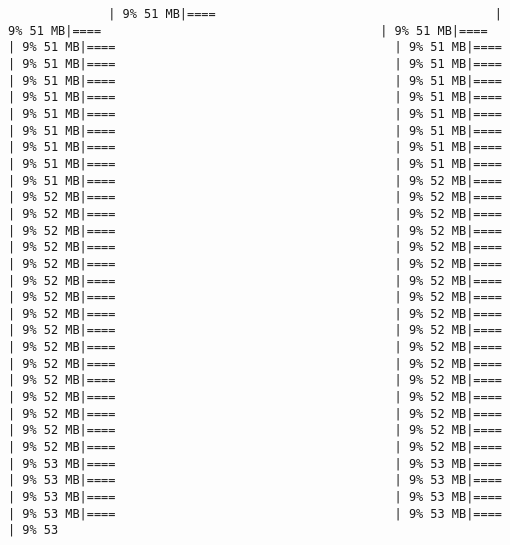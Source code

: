 \documentclass[
]{article}
\begin{document}
\begin{verbatim}
              | 9% 51 MB|====                                       | 9% 51 MB|====                                       | 9% 51 MB|====                                       | 9% 51 MB|====                                       | 9% 51 MB|====                                       | 9% 51 MB|====                                       | 9% 51 MB|====                                       | 9% 51 MB|====                                       | 9% 51 MB|====                                       | 9% 51 MB|====                                       | 9% 51 MB|====                                       | 9% 51 MB|====                                       | 9% 51 MB|====                                       | 9% 51 MB|====                                       | 9% 51 MB|====                                       | 9% 51 MB|====                                       | 9% 51 MB|====                                       | 9% 51 MB|====                                       | 9% 51 MB|====                                       | 9% 51 MB|====                                       | 9% 52 MB|====                                       | 9% 52 MB|====                                       | 9% 52 MB|====                                       | 9% 52 MB|====                                       | 9% 52 MB|====                                       | 9% 52 MB|====                                       | 9% 52 MB|====                                       | 9% 52 MB|====                                       | 9% 52 MB|====                                       | 9% 52 MB|====                                       | 9% 52 MB|====                                       | 9% 52 MB|====                                       | 9% 52 MB|====                                       | 9% 52 MB|====                                       | 9% 52 MB|====                                       | 9% 52 MB|====                                       | 9% 52 MB|====                                       | 9% 52 MB|====                                       | 9% 52 MB|====                                       | 9% 52 MB|====                                       | 9% 52 MB|====                                       | 9% 52 MB|====                                       | 9% 52 MB|====                                       | 9% 52 MB|====                                       | 9% 52 MB|====                                       | 9% 52 MB|====                                       | 9% 52 MB|====                                       | 9% 52 MB|====                                       | 9% 52 MB|====                                       | 9% 52 MB|====                                       | 9% 52 MB|====                                       | 9% 52 MB|====                                       | 9% 52 MB|====                                       | 9% 53 MB|====                                       | 9% 53 MB|====                                       | 9% 53 MB|====                                       | 9% 53 MB|====                                       | 9% 53 MB|====                                       | 9% 53 MB|====                                       | 9% 53 MB|====                                       | 9% 53 MB|====                                       | 9% 53 
\end{verbatim}
\end{document}
